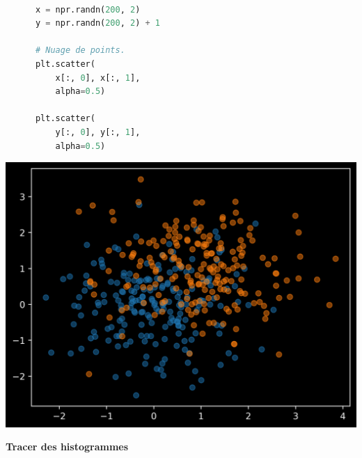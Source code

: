\documentclass[aspectratio=169]{beamer}
\begin{document}
\begin{frame}[fragile]{}{}
  \vfill
  \begin{minipage}{.48\textwidth}
    \begin{lstlisting}[language=Python]

      x = npr.randn(200, 2)
      y = npr.randn(200, 2) + 1

      # Nuage de points.
      plt.scatter(
          x[:, 0], x[:, 1],
          alpha=0.5)

      plt.scatter(
          y[:, 0], y[:, 1],
          alpha=0.5)
    \end{lstlisting}
  \end{minipage}%
  \hfill
  \begin{minipage}{.48\textwidth}
    \centering
    \includegraphics[width=\textwidth]{scatter_plot_multi}
  \end{minipage}
  \vfill
\end{frame}





\begin{frame}
  \vfill
  \centering
  \textbf{Tracer des histogrammes}
  \vfill
\end{frame}


{
}
\end{document}
